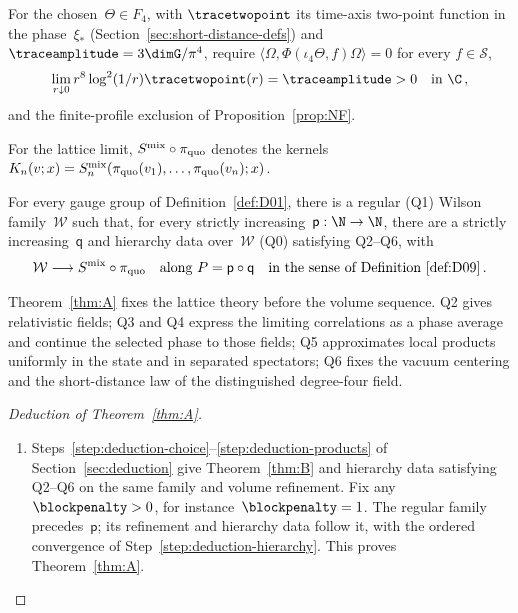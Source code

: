 \begin{definition}\label{def:Q6}
For the chosen~$\Theta\in F_4$, with $\tracetwopoint$ its time-axis two-point function in the phase~$\xi_*$ (Section~\ref{sec:short-distance-defs}) and $\traceamplitude=3\dimG/\pi^4$, require $\langle\Omega,\Phi(\iota_4\Theta,f)\Omega\rangle=0$ for every $f\in\mathcal S$,
\begin{equation*}
\lim_{r\downarrow0}r^8\log^2(1/r)\tracetwopoint(r)=\traceamplitude>0
\quad\text{in }\C\,,
\end{equation*}
and the finite-profile exclusion of Proposition~\ref{prop:NF}.
\end{definition}

For the lattice limit, $S^{\rm mix}\circ\pi_{\rm quo}$ denotes the kernels $K_n(v;x)=S_n^{\rm mix}(\pi_{\rm quo}(v_1),\ldots,\pi_{\rm quo}(v_n);x)$.

\setcounter{maintheorem}{0}
\begin{maintheorem}[Existence]\label{thm:A}
For every gauge group of Definition~\ref{def:D01}, there is a regular \textup{(Q1)} Wilson family~$\mathcal W$ such that, for every strictly increasing~$\mathsf p:\N\to\N$, there are a strictly increasing~$\mathsf q$ and hierarchy data over~$\mathcal W$ \textup{(Q0)} satisfying \textup{Q2--Q6}, with
\begin{equation*}
\mathcal W\longrightarrow S^{\rm mix}\circ\pi_{\rm quo}
\quad\text{along }P=\mathsf p\circ\mathsf q
\quad\text{in the sense of Definition~\ref{def:D09}}\,.
\end{equation*}
\end{maintheorem}

Theorem~\ref{thm:A} fixes the lattice theory before the volume sequence. Q2 gives relativistic fields; Q3 and Q4 express the limiting correlations as a phase average and continue the selected phase to those fields; Q5 approximates local products uniformly in the state and in separated spectators; Q6 fixes the vacuum centering and the short-distance law of the distinguished degree-four field.

\begin{proof}[Deduction of Theorem~\ref{thm:A}]
\begin{enumerate}[label=\textup{\arabic*.},ref=\arabic*,start=10]
\item\label{step:deduction-conclusion} Steps~\ref{step:deduction-choice}--\ref{step:deduction-products} of Section~\ref{sec:deduction} give Theorem~\ref{thm:B} and hierarchy data satisfying Q2--Q6 on the same family and volume refinement. Fix any~$\blockpenalty>0$, for instance~$\blockpenalty=1$. The regular family precedes~$\mathsf p$; its refinement and hierarchy data follow it, with the ordered convergence of Step~\ref{step:deduction-hierarchy}. This proves Theorem~\ref{thm:A}.\qedhere
\end{enumerate}
\end{proof}

